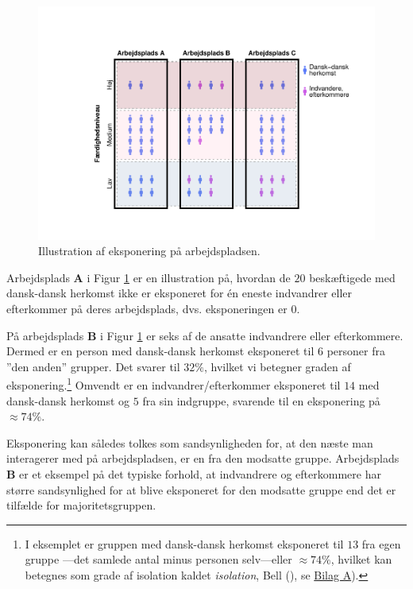 \documentclass[
]{book}
\begin{document}
\begin{figure}
\includegraphics[width=1\linewidth]{en-befolkning-blander-sig_files/figure-latex/fig-5-1-1} \caption{Illustration af eksponering på arbejdspladsen.}\label{fig:fig-5-1}
\end{figure}

Arbejdsplads \textbf{A} i Figur \ref{fig:fig-5-1} er en illustration på, hvordan de \(20\) beskæftigede med dansk-dansk herkomst ikke er eksponeret for én eneste indvandrer eller efterkommer på deres arbejdsplads, dvs. eksponeringen er \(0\).

På arbejdsplads \textbf{B} i Figur \ref{fig:fig-5-1} er seks af de ansatte indvandrere eller efterkommere. Dermed er en person med dansk-dansk herkomst eksponeret til \(6\) personer fra ''den anden'' grupper. Det svarer til \(32\%\), hvilket vi betegner graden af eksponering.\footnote{I eksemplet er gruppen med dansk-dansk herkomst eksponeret til \(13\) fra egen gruppe ---det samlede antal minus personen selv---eller \(\approx 74\%\), hvilket kan betegnes som grade af isolation kaldet \emph{isolation}, Bell (), se \hyperref[bilagA]{Bilag A}).} Omvendt er en indvandrer/efterkommer eksponeret til \(14\) med dansk-dansk herkomst og \(5\) fra sin indgruppe, svarende til en eksponering på \(\approx 74\%\).

Eksponering kan således tolkes som sandsynligheden for, at den næste man interagerer med på arbejdspladsen, er en fra den modsatte gruppe. Arbejdsplads \textbf{B} er et eksempel på det typiske forhold, at indvandrere og efterkommere har større sandsynlighed for at blive eksponeret for den modsatte gruppe end det er tilfælde for majoritetsgruppen.
\end{document}
